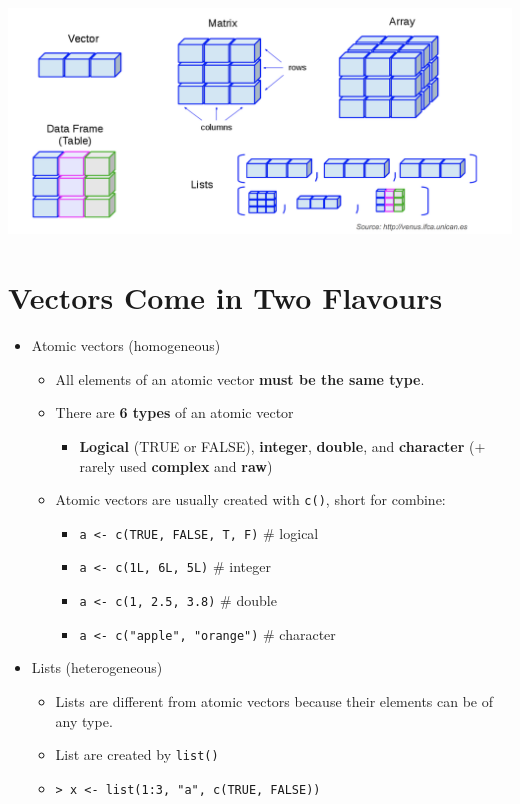 \documentclass[]{book}
\providecommand{\tightlist}{%
  \setlength{\itemsep}{0pt}\setlength{\parskip}{0pt}}
\begin{document}
\includegraphics{datastructure.png}

\hypertarget{vectors-come-in-two-flavours}{%
\section{Vectors Come in Two Flavours}\label{vectors-come-in-two-flavours}}

\begin{itemize}
\tightlist
\item
  Atomic vectors (homogeneous)

  \begin{itemize}
  \tightlist
  \item
    All elements of an atomic vector \textbf{must be the same type}.
  \item
    There are \textbf{6 types} of an atomic vector

    \begin{itemize}
    \tightlist
    \item
      \textbf{Logical} (TRUE or FALSE), \textbf{integer}, \textbf{double}, and \textbf{character} (+ rarely used \textbf{complex} and \textbf{raw})
    \end{itemize}
  \item
    Atomic vectors are usually created with \texttt{c()}, short for combine:

    \begin{itemize}
    \tightlist
    \item
      \texttt{a\ \textless{}-\ c(TRUE,\ FALSE,\ T,\ F)} \# logical
    \item
      \texttt{a\ \textless{}-\ c(1L,\ 6L,\ 5L)} \# integer
    \item
      \texttt{a\ \textless{}-\ c(1,\ 2.5,\ 3.8)} \# double
    \item
      \texttt{a\ \textless{}-\ c("apple",\ "orange")} \# character
    \end{itemize}
  \end{itemize}
\item
  Lists (heterogeneous)

  \begin{itemize}
  \tightlist
  \item
    Lists are different from atomic vectors because their elements can be of any type.
  \item
    List are created by \texttt{list()}
  \item
    \texttt{\textgreater{}\ x\ \textless{}-\ list(1:3,\ "a",\ c(TRUE,\ FALSE))}
  \end{itemize}
\end{itemize}
\end{document}
